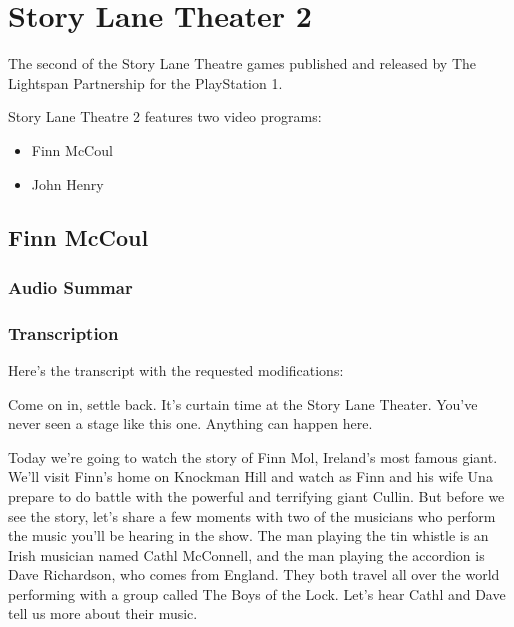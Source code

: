\chapter{Story Lane Theater 2}


The second of the Story Lane Theatre games published and released by The Lightspan Partnership for the PlayStation 1.

Story Lane Theatre 2 features two video programs:

\begin{itemize}
    \item Finn McCoul
    \item John Henry
\end{itemize}

\clearpage
\newpage

\section{Finn McCoul}

\subsection{Audio Summar}

\subsection{Transcription}

Here's the transcript with the requested modifications:

Come on in, settle back. It's curtain time at the Story Lane Theater. You've never seen a stage like this one. Anything can happen here.

Today we're going to watch the story of Finn Mol, Ireland's most famous giant. We'll visit Finn's home on Knockman Hill and watch as Finn and his wife Una prepare to do battle with the powerful and terrifying giant Cullin. But before we see the story, let's share a few moments with two of the musicians who perform the music you'll be hearing in the show. The man playing the tin whistle is an Irish musician named Cathl McConnell, and the man playing the accordion is Dave Richardson, who comes from England. They both travel all over the world performing with a group called The Boys of the Lock. Let's hear Cathl and Dave tell us more about their music.

